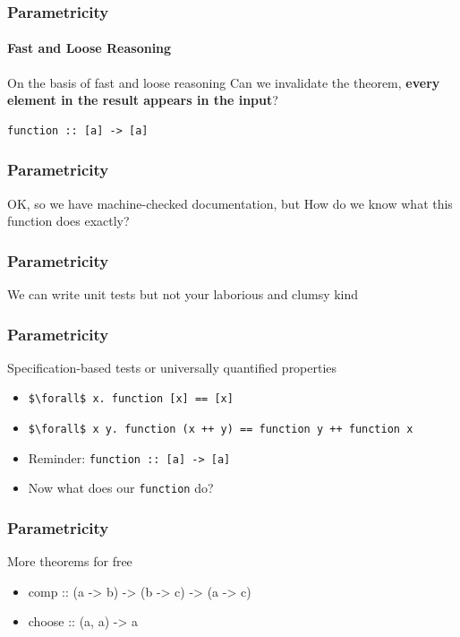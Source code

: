 \begin{frame}[fragile]
\frametitle{Parametricity}
\framesubtitle{Fast and Loose Reasoning}
\begin{block}{On the basis of fast and loose reasoning}
Can we invalidate the theorem, \textbf{every element in the result appears in the input}?
\end{block}
\begin{lstlisting}[style=haskell]
function :: [a] -> [a]
\end{lstlisting}
\end{frame}


\begin{frame}
\frametitle{Parametricity}
\begin{block}{OK, so we have machine-checked documentation, but}
How do we know what this function does exactly?
\end{block}
\end{frame}


\begin{frame}
\frametitle{Parametricity}
\begin{block}{We can write unit tests}
but not your laborious and clumsy kind
\end{block}
\end{frame}


\begin{frame}[fragile]
\frametitle{Parametricity}
\begin{block}{Specification-based tests or universally quantified properties\cite{claessen2011quickcheck}}
\begin{itemize}
  \item<1-> \lstinline[style=haskell,mathescape]{$\forall$ x. function [x] == [x]}
  \item<1-> \lstinline[style=haskell,mathescape]{$\forall$ x y. function (x ++ y) == function y ++ function x}
  \item<2-> Reminder: \lstinline{function :: [a] -> [a]}
  \item<2-> Now what does our \lstinline{function} do?
\end{itemize}
\end{block}
\end{frame}


\begin{frame}[fragile]
\frametitle{Parametricity}
\begin{block}{More theorems for free}
\begin{itemize}
  \item<1-> comp :: (a -> b) -> (b -> c) -> (a -> c)
  \item<2-> choose :: (a, a) -> a
\end{itemize}
\begin{lstlisting}
\end{lstlisting}
\end{block}
\end{frame}
